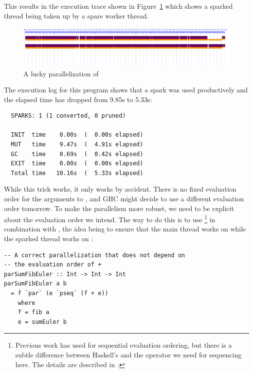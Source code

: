 This results in the execution trace shown in Figure~\ref{f:lucky} which shows a sparked thread being taken up by a spare worker thread. 

\begin{figure}
\begin{center}
\includegraphics[width=18cm]{SumEuler2-N2-eventlog.pdf}
\end{center}
\caption{A lucky parallelization of }
\label{f:lucky}
\end{figure}

The execution log for this program shows that a spark was used productively and the elapsed time has dropped from 9.85s to 5.33s:

\begin{verbatim}
  SPARKS: 1 (1 converted, 0 pruned)

  INIT  time    0.00s  (  0.00s elapsed)
  MUT   time    9.47s  (  4.91s elapsed)
  GC    time    0.69s  (  0.42s elapsed)
  EXIT  time    0.00s  (  0.00s elapsed)
  Total time   10.16s  (  5.33s elapsed)
\end{verbatim}

While this trick works, it only works by accident.  There is no fixed
evaluation order for the arguments to \codef{+}, and GHC might decide
to use a different evaluation order tomorrow.  To make the parallelism
more robust, we need to be explicit about the evaluation order we
intend.  The way to do this is to use \footnote{Previous
  work has used  for sequential evaluation ordering, but
  there is a subtle difference between Haskell's  and the
  operator we need for sequencing here.  The details are described in
  \citet{multicore-ghc}.} in combination with
, the idea being to ensure that the main thread works on
 while the sparked thread works on :

\begin{lstlisting}
-- A correct parallelization that does not depend on
-- the evaluation order of +
parSumFibEuler :: Int -> Int -> Int
parSumFibEuler a b
  = f `par` (e `pseq` (f + e))
    where
    f = fib a
    e = sumEuler b
\end{lstlisting}

